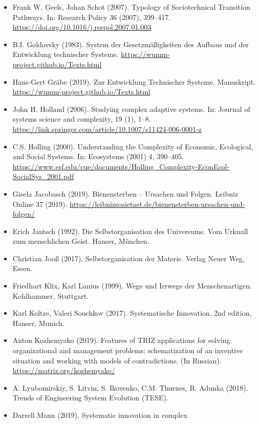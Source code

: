 \documentclass[11pt,a4paper]{article}
\begin{document}
\begin{itemize}
\item Frank W. Geels, Johan Schot (2007). Typology of Sociotechnical
  Transition Pathways. In: Research Policy 36 (2007), 399–417.\\
  \url{https://doi.org/10.1016/j.respol.2007.01.003} 
\item B.I. Goldovsky (1983). System der Gesetzmäßigkeiten des Aufbaus und der
  Entwicklung technischer Systeme.
  \url{https://wumm-project.github.io/Texts.html} 
\item Hans-Gert Gräbe (2019). Zur Entwicklung Technischer Systeme.
  Manuskript. \\ \url{https://wumm-project.github.io/Texts.html}
\item John H. Holland (2006). Studying complex adaptive systems. In: Journal
  of systems science and complexity, 19 (1),
  1–8.\\ \url{https://link.springer.com/article/10.1007/s11424-006-0001-z}
\item C.S. Holling (2000). Understanding the Complexity of Economic,
  Ecological, and Social Systems. In: Ecosystems (2001) 4, 390–405.
  \url{https://www.esf.edu/cue/documents/Holling_Complexity-EconEcol-SocialSys_2001.pdf}
\item Gisela Jacobasch (2019). Bienensterben -- Ursachen und Folgen.  Leibniz
  Online 37 (2019).
  \url{https://leibnizsozietaet.de/bienensterben-ursachen-und-folgen/}
\item Erich Jantsch (1992). Die Selbstorganisation des Universums. Vom Urknall
  zum menschlichen Geist.  Hanser, München.
\item Christian Jooß (2017). Selbstorganisation der Materie.  Verlag Neuer
  Weg, Essen.
\item Friedhart Klix, Karl Lanius (1999). Wege und Irrwege der
  Menschenartigen.  Kohlhammer, Stuttgart.
\item Karl Koltze, Valeri Souchkov (2017). Systematische Innovation.  2nd
  edition, Hanser, Munich.
\item Anton Kozhemyako (2019). Features of TRIZ applications for solving
  organizational and management problems: schematization of an inventive
  situation and working with models of contradictions. (In Russian).\\
  \url{https://matriz.org/kozhemyako/}
\item A. Lyubomirskiy, S. Litvin, S. Ikovenko, C.M. Thurnes, R. Adunka (2018).
  Trends of Engineering System Evolution (TESE).
\item Darrell Mann (2019).  Systematic innovation in complex

\end{itemize}
\end{document}
